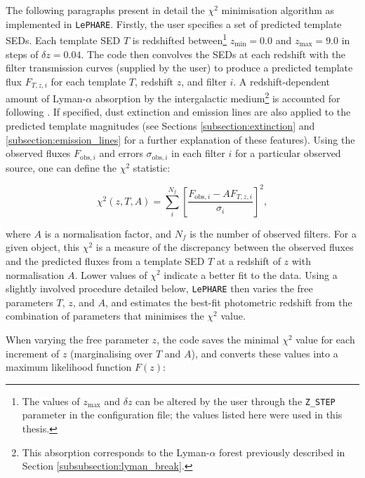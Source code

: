 The following paragraphs present in detail the $\chi^2$ minimisation algorithm as implemented in \texttt{LePHARE}. Firstly, the user specifies a set of predicted template SEDs. Each template SED $T$ is redshifted between\footnote{The values of $z_{\mathrm{max}}$ and $\delta z$ can be altered by the user through the \texttt{Z\_STEP} parameter in the configuration file; the values listed here were used in this thesis.} $z_{\mathrm{min}}=0.0$ and $z_{\mathrm{max}}=9.0$ in steps of $\delta z=0.04$. The code then convolves the SEDs at each redshift with the filter transmission curves (supplied by the user) to produce a predicted template flux $F_{T,z,i}$ for each template $T$, redshift $z$, and filter $i$. A redshift-dependent amount of Lyman-$\alpha$ absorption by the intergalactic medium\footnote{This absorption corresponds to the Lyman-$\alpha$ forest previously described in Section \ref{subsubsection:lyman_break}.} is accounted for following \cite{1995ApJ...441...18M}. If specified, dust extinction and emission lines are also applied to the predicted template magnitudes (see Sections \ref{subsection:extinction} and \ref{subsection:emission_lines} for a further explanation of these features). Using the observed fluxes $F_{\mathrm{obs},i}$ and errors $\sigma_{\mathrm{obs},i}$ in each filter $i$ for a particular observed source, one can define the $\chi^2$ statistic: 



\begin{equation}
\chi^2(z,T,A) = \sum_{i}^{N_{f}}{\left[ \frac{F_{\mathrm{obs},i}-A F_{T,z,i}}{\sigma_{i}} \right]^2}, \label{eqn:chi_squared}
\end{equation}

\noindent where $A$ is a normalisation factor, and $N_{f}$ is the number of observed filters. For a given object, this $\chi^2$ is a measure of the discrepancy between the observed fluxes and the predicted fluxes from a template SED $T$ at a redshift of $z$ with normalisation $A$. Lower values of $\chi^2$ indicate a better fit to the data. Using a slightly involved procedure detailed below, \texttt{LePHARE} then varies the free parameters $T$, $z$, and $A$, and estimates the best-fit photometric redshift from the combination of parameters that minimises the $\chi^2$ value. \par


When varying the free parameter $z$, the code saves the minimal $\chi^2$ value for each increment of $z$ (marginalising over $T$ and $A$), and converts these values into a maximum likelihood function $F(z)$:

